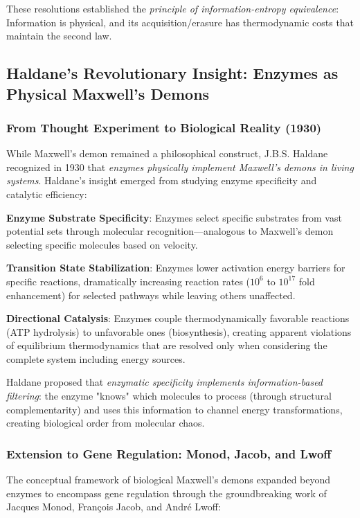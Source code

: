 \documentclass[11pt,a4paper]{article}
\begin{document}
These resolutions established the \textit{principle of information-entropy equivalence}: Information is physical, and its acquisition/erasure has thermodynamic costs that maintain the second law.

\subsection{Haldane's Revolutionary Insight: Enzymes as Physical Maxwell's Demons}

\subsubsection{From Thought Experiment to Biological Reality (1930)}

While Maxwell's demon remained a philosophical construct, J.B.S. Haldane recognized in 1930 that \textit{enzymes physically implement Maxwell's demons in living systems}\cite{haldane1930enzymes}. Haldane's insight emerged from studying enzyme specificity and catalytic efficiency:

\textbf{Enzyme Substrate Specificity}: Enzymes select specific substrates from vast potential sets through molecular recognition—analogous to Maxwell's demon selecting specific molecules based on velocity.

\textbf{Transition State Stabilization}: Enzymes lower activation energy barriers for specific reactions, dramatically increasing reaction rates ($10^6$ to $10^{17}$ fold enhancement) for selected pathways while leaving others unaffected\cite{wolfenden2006degrees}.

\textbf{Directional Catalysis}: Enzymes couple thermodynamically favorable reactions (ATP hydrolysis) to unfavorable ones (biosynthesis), creating apparent violations of equilibrium thermodynamics that are resolved only when considering the complete system including energy sources.

Haldane proposed that \textit{enzymatic specificity implements information-based filtering}: the enzyme "knows" which molecules to process (through structural complementarity) and uses this information to channel energy transformations, creating biological order from molecular chaos.

\subsubsection{Extension to Gene Regulation: Monod, Jacob, and Lwoff}

The conceptual framework of biological Maxwell's demons expanded beyond enzymes to encompass gene regulation through the groundbreaking work of Jacques Monod, François Jacob, and André Lwoff\cite{monod1961genetic,jacob1961genetic}:
\end{document}
